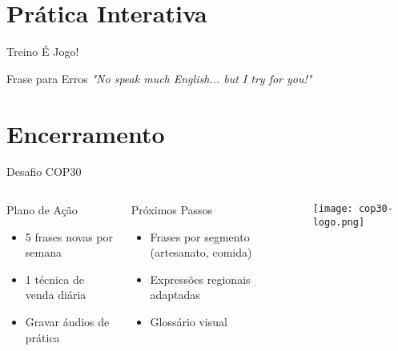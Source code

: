 \documentclass[12pt]{beamer}
\begin{document}
\section{Prática Interativa}

\begin{frame}{Treino É Jogo!}
  \centering
  
  \vspace{5mm}
  \begin{exampleblock}{Frase para Erros}
    \centering
    \large\textit{"No speak much English... but I try for you!"}
  \end{exampleblock}
\end{frame}

\section{Encerramento}

\begin{frame}{Desafio COP30}
  \begin{columns}
    \begin{block}{Plano de Ação}
      \begin{itemize}
        \item 5 frases novas por semana
        \item 1 técnica de venda diária
        \item Gravar áudios de prática
      \end{itemize}
    \end{block}
    
    \begin{alertblock}{Próximos Passos}
      \begin{itemize}
        \item Frases por segmento (artesanato, comida)
        \item Expressões regionais adaptadas
        \item Glossário visual
      \end{itemize}
    \end{alertblock}

    \texttt{[image: cop30-logo.png]}
  \end{columns}
\end{frame}
\end{document}
